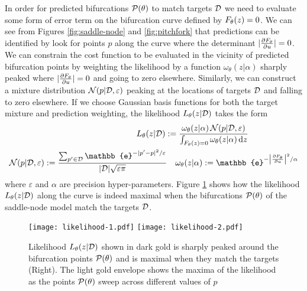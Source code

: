 In order for predicted bifurcations $\mathcal{P}(\theta)$ to match targets $\mathcal{D}$ we need to evaluate some form of error term on the bifurcation curve defined by $F_{\theta}(z)=0$. We can see from Figures \ref{fig:saddle-node} and \ref{fig:pitchfork} that predictions can be identified by look for points $p$ along the curve where the determinant $|\frac{\partial F_{\theta}}{\partial u}|=0$. We can constrain the cost function to be evaluated in the vicinity of predicted bifurcation points by weighting the likelihood by a function $\omega_\theta(z|\alpha)$ sharply peaked where $|\frac{\partial F_{\theta}}{\partial u}|=0$ and going to zero elsewhere. Similarly, we can construct a mixture distribution $\mathcal{N}(p|\mathcal{D},\varepsilon)$ peaking at the locations of targets $\mathcal{D}$ and falling to zero elsewhere. If we choose Gaussian basis functions for both the target mixture and prediction weighting, the likelihood $L_{\theta}(z|\mathcal{D})$ takes the form
\begin{align}
    L_{\theta}(z|\targets) := 
    \frac{\omega_\theta(z|\alpha)\,\mathcal{N}(p|\targets,\varepsilon)}{\int_{\rates(z)=0} \omega_\theta(z|\alpha)\,\mathrm{d}z}\label{eq:likelihood}\qquad\qquad\qquad\\
    \mathcal{N}(p|\targets,\varepsilon):=\frac{\sum_{p'\in\targets}\mathbb{e}^{-|p'-p|^2/\varepsilon}}{|\targets|\sqrt{\varepsilon\pi}}
    \quad
    \omega_\theta(z|\alpha):= \mathbb{e}^{-\left|\frac{\partial F_{\theta}}{\partial u}\right|^2/\alpha}
\end{align}
where $\varepsilon$ and $\alpha$ are precision hyper-parameters. Figure \ref{fig:likelihood} shows how the likelihood $L_{\theta}(z|\mathcal{D})$ along the curve is indeed maximal when the bifurcations $\mathcal{P}(\theta)$ of the saddle-node model match the targets $\mathcal{D}$.

\begin{figure}[H]
\centering{}
\captionsetup{justification=centering}
\texttt{[image: likelihood-1.pdf]}
\texttt{[image: likelihood-2.pdf]}
\caption{Likelihood $L_{\theta}(z|\mathcal{D})$ shown in dark gold is sharply peaked around the bifurcation points $\mathcal{P}(\theta)$ and is maximal when they match the targets (Right). The light gold envelope shows the maxima of the likelihood as the points $\mathcal{P}(\theta)$ sweep across different values of $p$}
\label{fig:likelihood}
\end{figure}

